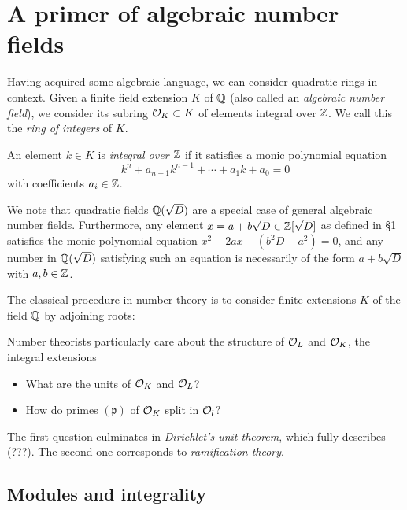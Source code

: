 \section{A primer of algebraic number fields}


Having acquired some algebraic language, we can consider quadratic rings in context. Given a finite field extension $K$ of $\mathbb{Q}$ (also called an \emph{algebraic number field}), we consider its subring $\mathcal{O}_K\subset K$ of elements integral over $\mathbb{Z}$. We call this the \emph{ring of integers} of $K$.

An element $k\in K$ is \emph{integral over $\mathbb{Z}$} if it satisfies a monic polynomial equation
\[
	k^n + a_{n-1}k^{n-1} + \cdots + a_1k + a_0 = 0
\]
with coefficients $a_i\in\mathbb{Z}$.

We note that quadratic fields $\mathbb{Q}(\sqrt{D})$ are a special case of general algebraic number fields. Furthermore, any element $x=a+b\sqrt{D}\in\mathbb{Z}[\sqrt{D}]$ as defined in §1 satisfies the monic polynomial equation $x^2-2ax-(b^2D-a^2)=0$, and any number in $\mathbb{Q}(\sqrt{D})$ satisfying such an equation is necessarily of the form $a+b\sqrt{D}$ with $a,b\in\mathbb{Z}$.

The classical procedure in number theory is to consider finite extensions $K$ of the field $\mathbb{Q}$ by adjoining roots:

\begin{center}
\end{center}


Number theorists particularly care about the structure of $\mathcal{O}_L$ and $\mathcal{O}_K$, the integral extensions 
\begin{itemize}
	\item What are the units of $\mathcal{O}_K$ and $\mathcal{O}_L$?
	\item How do primes $(\mathfrak{p})$ of $\mathcal{O}_K$ split in $\mathcal{O}_l$?
\end{itemize}

The first question culminates in \emph{Dirichlet's unit theorem}, which fully describes (???). The second one corresponds to \emph{ramification theory}.


\subsection{Modules and integrality}

